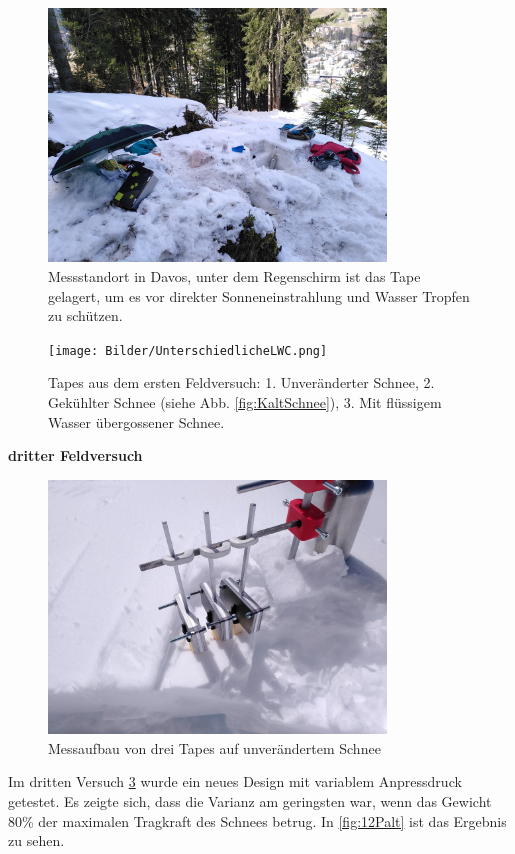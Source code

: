 \begin{figure}[H]
    \centering
    \includegraphics[width=0.8\textwidth]{Bilder/IMG_20240411_124421.jpg}
    \caption{Messstandort in Davos, unter dem Regenschirm ist das Tape gelagert, um es vor direkter Sonneneinstrahlung und Wasser Tropfen zu schützen.} 
    \label{fig:DavosMessung}
\end{figure}

\begin{figure}[H]
    \centering
    \texttt{[image: Bilder/UnterschiedlicheLWC.png]}
    \caption{Tapes aus dem ersten Feldversuch: 1. Unveränderter Schnee, 2. Gekühlter Schnee (siehe Abb. \ref{fig:KaltSchnee}),  3. Mit flüssigem Wasser übergossener Schnee.} 
    \label{fig:DavosMessung}
\end{figure}


\newpage

\textbf{dritter Feldversuch}
\label{drittFeldVer}

\begin{figure}[H]
    \centering
    \includegraphics[width=0.8\textwidth]{Bilder/aufbauTitlis.jpeg}
    \caption{Messaufbau von drei Tapes auf unverändertem Schnee} 
    \label{fig:aufbauTitlis}
\end{figure}
Im dritten Versuch \ref{fig:aufbauTitlis} wurde ein neues Design mit variablem Anpressdruck getestet. Es zeigte sich, dass die Varianz am geringsten war, wenn das Gewicht 80\% der maximalen Tragkraft des Schnees betrug. In \ref{fig:12Palt} ist das Ergebnis zu sehen.

